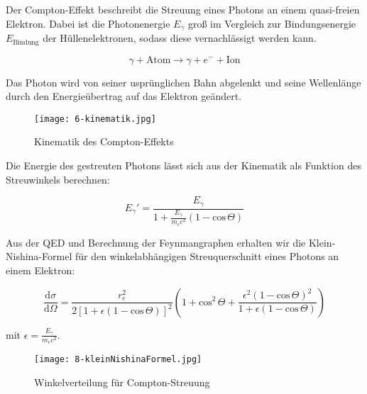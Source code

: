Der Compton-Effekt beschreibt die Streuung eines Photons an einem quasi-freien Elektron. Dabei ist
die Photonenergie $E_\gamma$ groß im Vergleich zur Bindungsenergie $E_{\text{Bindung}}$ der
Hüllenelektronen, sodass diese vernachlässigt werden kann.

\[ \gamma + \text{Atom} \longrightarrow \gamma + e^- +\text{Ion}\]

Das Photon wird von seiner usprünglichen Bahn abgelenkt und seine Wellenlänge durch den
Energieübertrag auf das Elektron geändert. 

\begin{figure}[H]
	\centering
	\texttt{[image: 6-kinematik.jpg]}
	\caption{Kinematik des Compton-Effekts	}
	\label{}
\end{figure}

Die Energie des gestreuten Photons lässt sich aus der Kinematik als Funktion des Streuwinkels
berechnen:

\[ E_\gamma' = \frac{E_\gamma}{1+ \frac{E_\gamma}{m_ec^2}\left(1-\text{cos}\,\Theta\right)} \]

Aus der QED und Berechnung der Feynmangraphen erhalten wir die Klein-Nishina-Formel für den
winkelabhängigen Streuquerschnitt eines Photons an einem Elektron:

\[ \frac{\mathrm{d}\sigma}{\mathrm{d}\Omega} = \frac{r_e^2}{2
\left[1+\epsilon\left(1-\text{cos}\,\Theta \right) \right]^2} \left(1+\text{cos}^2\,\Theta +
\frac{\epsilon^2\left(1-\text{cos}\,\Theta \right)^2}{1+\epsilon\left(1- \text{cos}\,\Theta \right)}
\right)
\]

mit $\epsilon = \frac{E_\gamma}{m_ec^2}$.

\begin{figure}[H]
	\begin{minipage}[b]{0.5\textwidth}
		\begin{figure}[H]
		\centering
		
		\end{figure}
	\end{minipage}
	\hspace{5mm} 
	\begin{minipage}[b]{0.5\textwidth}
		\begin{figure}[H]
		\centering
		
		\vspace{3mm}
		\end{figure} 
	\end{minipage} 
\end{figure}


\begin{figure}[H]
	\centering
	\texttt{[image: 8-kleinNishinaFormel.jpg]}
	\caption{Winkelverteilung für Compton-Streuung}
	\label{kleinnishina}
\end{figure}

